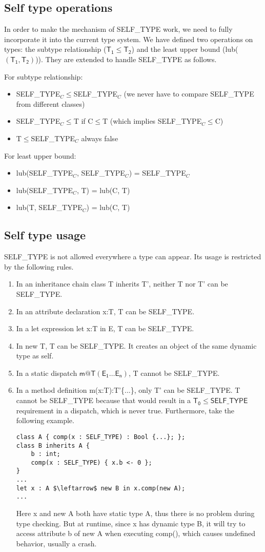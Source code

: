 \subsection{Self type operations}
In order to make the mechanism of SELF\_TYPE work, we need to fully incorporate it into the current type system. We have defined two operations on types: the subtype relationship ($\mathsf{T_1\leq T_2}$) and the least upper bound (lub($\mathsf{(T_1,T_2)}$)). They are extended to handle SELF\_TYPE as follows.

For subtype relationship: 
\begin{itemize}
\item SELF\_TYPE$_C\leq$SELF\_TYPE$_C$ (we never have to compare SELF\_TYPE from different classes)
\item SELF\_TYPE$_C\leq$T if C$\leq$T (which implies SELF\_TYPE$_C\leq$C)
\item T$\leq$SELF\_TYPE$_C$ always false
\end{itemize} 

For least upper bound:
\begin{itemize}
\item lub(SELF\_TYPE$_C$, SELF\_TYPE$_C$) = SELF\_TYPE$_C$
\item lub(SELF\_TYPE$_C$, T) = lub(C, T)
\item lub(T, SELF\_TYPE$_C$) = lub(C, T)
\end{itemize}
\subsection{Self type usage}
SELF\_TYPE is not allowed everywhere a type can appear. Its usage is restricted by the following rules.
\begin{enumerate}
\item In an inheritance chain \textsf{class T inherits T'}, neither T nor T' can be SELF\_TYPE.
\item In an attribute declaration \textsf{x:T}, T can be SELF\_TYPE.
\item In a let expression \textsf{let x:T in E}, T can be SELF\_TYPE.
\item In \textsf{new T}, T can be SELF\_TYPE. It creates an object of the same dynamic type as self.
\item In a static dispatch $\mathsf{m@T(E_1\dots E_n)}$, T cannot be SELF\_TYPE.
\item In a method definition \textsf{m(x:T):T'}\{...\}, only T' can be SELF\_TYPE. T cannot be SELF\_TYPE because that would result in a $\mathsf{T_0\leq SELF\_TYPE}$ requirement in a dispatch, which is never true. Furthermore, take the following example.
\begin{lstlisting}[mathescape = true]
class A { comp(x : SELF_TYPE) : Bool {...}; };
class B inherits A {
	b : int;
	comp(x : SELF_TYPE) { x.b <- 0 };
}
...
let x : A $\leftarrow$ new B in x.comp(new A);
...
\end{lstlisting}
Here x and new A both have static type A, thus there is no problem during type checking. But at runtime, since x has dynamic type B, it will try to access attribute b of new A when executing comp(), which causes undefined behavior, usually a crash. 
\end{enumerate}
